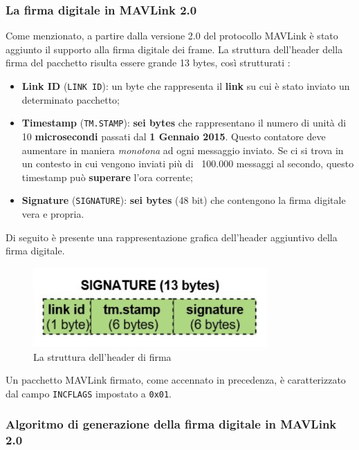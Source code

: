 \documentclass[a4paper, 12pt, oneside]{article}
\begin{document}
\subsubsection{La firma digitale in MAVLink 2.0}
Come menzionato, a partire dalla versione 2.0 del protocollo MAVLink è stato aggiunto il supporto alla firma digitale dei frame. La struttura dell'header della firma del pacchetto risulta essere grande 13 bytes, così strutturati \cite{sign-frame-fotmat}:

\begin{itemize}
    \item \textbf{Link ID} (\texttt{LINK ID}): un byte che rappresenta il \textbf{link} su cui è stato inviato un determinato pacchetto;
    \item \textbf{Timestamp} (\texttt{TM.STAMP}): \textbf{sei bytes} che rappresentano il numero di unità di 10 \textbf{microsecondi} passati dal \textbf{1 Gennaio 2015}. Questo contatore deve aumentare in maniera \textit{monotona} ad ogni messaggio inviato. Se ci si trova in un contesto in cui vengono inviati più di ~100.000 messaggi al secondo, questo timestamp può \textbf{superare} l'ora corrente;
    \item \textbf{Signature} (\texttt{SIGNATURE}): \textbf{sei bytes} (48 bit) che contengono la firma digitale vera e propria.
\end{itemize}

Di seguito è presente una rappresentazione grafica dell'header aggiuntivo della firma digitale.

\begin{figure}[H]
    \centering
    \includegraphics[width=0.8\textwidth]{images/mavlink2-signature.png}
    \caption{La struttura dell'header di firma}
\end{figure}

Un pacchetto MAVLink firmato, come accennato in precedenza, è caratterizzato dal campo \texttt{INCFLAGS} impostato a \texttt{0x01}.

\newpage

\subsubsection{Algoritmo di generazione della firma digitale in MAVLink 2.0}
\end{document}
